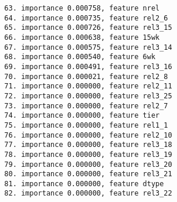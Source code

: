 \begin{verbatim}
  63. importance 0.000758, feature nrel
  64. importance 0.000735, feature rel2_6
  65. importance 0.000726, feature rel3_15
  66. importance 0.000638, feature 15wk
  67. importance 0.000575, feature rel3_14
  68. importance 0.000540, feature 6wk
  69. importance 0.000491, feature rel3_16
  70. importance 0.000021, feature rel2_8
  71. importance 0.000000, feature rel2_11
  72. importance 0.000000, feature rel3_25
  73. importance 0.000000, feature rel2_7
  74. importance 0.000000, feature tier
  75. importance 0.000000, feature rel1_1
  76. importance 0.000000, feature rel2_10
  77. importance 0.000000, feature rel3_18
  78. importance 0.000000, feature rel3_19
  79. importance 0.000000, feature rel3_20
  80. importance 0.000000, feature rel3_21
  81. importance 0.000000, feature dtype
  82. importance 0.000000, feature rel3_22
\end{verbatim}
